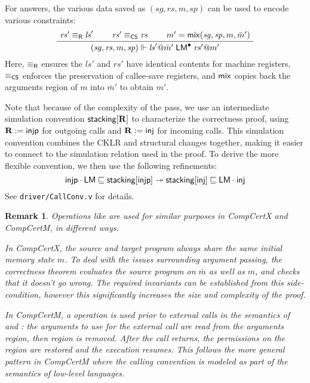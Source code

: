 \documentclass[sigplan,screen]{acmart}
\newtheorem{remark}[theorem]{Remark}
\newenvironment{optional}{}{}
\begin{document}
\begin{optional}
For answers,
the various data saved as
$(\mathit{sg}, \mathit{rs}, m, \mathit{sp})$
can be used to encode various constraints:
\[
  \AxiomC{$\mathit{rs}' \equiv_\kw{R} \mathit{ls}'$}
  \AxiomC{$\mathit{rs}' \equiv_\kw{CS} \mathit{rs}$}
  \AxiomC{$m' = \kw{mix}(\mathit{sg}, \mathit{sp}, m, \bar{m}')$}
  \TrinaryInfC{$
    (\mathit{sg}, \mathit{rs}, m, \mathit{sp}) \Vdash
    \mathit{ls}'@\bar{m}'
    \mathrel{\cc{L}{M}^\ans}
    \mathit{rs}'@m'$}
  \DisplayProof
\]
Here,
$\equiv_{ \mathsf{R} }$ ensures the $\mathit{ls}'$ and $\mathit{rs}'$
have identical contents for machine registers,
$\equiv_{ \mathsf{CS} }$ enforces the preservation of callee-save registers,
and $ \mathsf{mix} $
copies back the arguments region of $m$ into $\bar{m}'$ to obtain $m'$.

Note that because of the complexity of the  pass,
we use an intermediate simulation convention
$ \mathsf{stacking} [\mathbf{R}]$
to characterize the correctness proof,
using
$\mathbf{R} :=  \mathsf{injp} $ for outgoing calls and
$\mathbf{R} :=  \mathsf{inj} $ for incoming calls.
This simulation convention combines the CKLR and
structural changes together,
making it easier to connect to the simulation relation
used in the  proof.
To derive the more flexible convention,
we then use the following refinements:
\[
   \mathsf{injp}  \cdot { \ensuremath{ \mathsf{LM} } } \sqsubseteq  \mathsf{stacking} [ \mathsf{injp} ]
  \twoheadrightarrow
   \mathsf{stacking} [ \mathsf{inj} ] \sqsubseteq { \ensuremath{ \mathsf{LM} } } \cdot  \mathsf{inj} 
\]
See \texttt{driver/CallConv.v} for details.

\begin{remark}
Operations like  are used
for similar purposes in CompCertX and CompCertM,
in different ways.

In CompCertX,
the source and target program always share
the same initial memory state $m$.
To deal with the issues surrounding argument passing,
the correctness theorem evaluates the source program
on $\bar{m}$ as well as $m$,
and checks that it doesn't go wrong.
The required  invariants can be established
from this side-condition,
however this
significantly increases the size and complexity of the proof.

In CompCertM,
a  operation is used prior to external calls
in the semantics of  and :
the arguments to use for the external call are read
from the arguments region,
then region is removed.
After the call returns,
the permissions on the region are restored
and the execution resumes.
This follows the more general pattern in CompCertM
where the calling convention is modeled as part of
the semantics of low-level languages.
\end{remark}


\end{optional}
\end{document}
